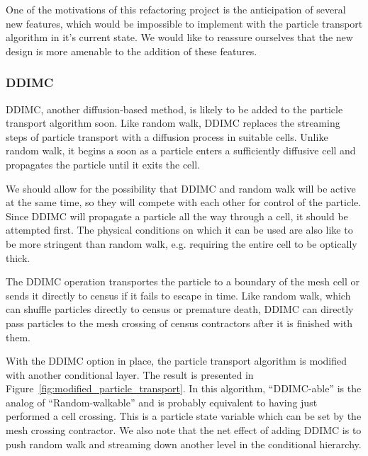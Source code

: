 \documentclass[memo]{ResearchNote}
\begin{document}
One of the motivations of this refactoring project is the anticipation
of several new features, which would be impossible to implement with
the particle transport algorithm in it's current state. We would like
to reassure ourselves that the new design is more amenable to the
addition of these features. 

\subsubsection{DDIMC} \label{sec:DDIMC}

DDIMC, another diffusion-based method, is likely to be added to the
particle transport algorithm soon. Like random walk, DDIMC replaces
the streaming steps of particle transport with a diffusion process in
suitable cells. Unlike random walk, it begins a soon as a particle
enters a sufficiently diffusive cell and propagates the particle until
it exits the cell.

We should allow for the possibility that DDIMC and random walk will be
active at the same time, so they will compete with each other for
control of the particle. Since DDIMC will propagate a particle all the
way through a cell, it should be attempted first. The physical
conditions on which it can be used are also like to be more stringent
than random walk, e.g. requiring the entire cell to be optically
thick.

The DDIMC operation transportes the particle to a boundary of the mesh
cell or sends it directly to census if it fails to escape in time.
Like random walk, which can shuffle particles directly to census or
premature death, DDIMC can directly pass particles to the mesh
crossing of census contractors after it is finished with them.

With the DDIMC option in place, the particle transport algorithm is
modified with another conditional layer. The result is presented in
Figure~\ref{fig:modified_particle_transport}. In this algorithm,
``DDIMC-able'' is the analog of ``Random-walkable'' and is probably
equivalent to having just performed a cell crossing. This is a
particle state variable which can be set by the mesh crossing
contractor. We also note that the net effect of adding DDIMC is to
push random walk and streaming down another level in the conditional
hierarchy.
\end{document}
